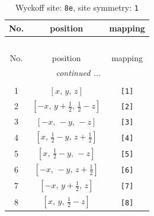 \documentclass[fleqn,8pt]{jsarticle}
\begin{document}
\renewcommand{\arraystretch}{1.2}
\begin{longtable}{ccc}
\caption{Wyckoff site: {\tt 8e}, site symmetry: {\tt 1}}
 \\
 \hline \hline
No. & position & mapping \\ \hline \endfirsthead

\multicolumn{2}{l}{\tablename\ \thetable{}} \\
 \hline \hline
No. & position & mapping \\ \hline \endhead

 \hline \hline
\multicolumn{2}{r}{\footnotesize\it continued ...} \\ \endfoot

 \hline \hline
\multicolumn{2}{r}{} \\ \endlastfoot

1 & $\left[ x,\, y,\, z \right]$ & {\tt [1]} \\ \hline
2 & $\left[ - x,\, y + \frac{1}{2},\, \frac{1}{2} - z \right]$ & {\tt [2]} \\ \hline
3 & $\left[ - x,\, - y,\, - z \right]$ & {\tt [3]} \\ \hline
4 & $\left[ x,\, \frac{1}{2} - y,\, z + \frac{1}{2} \right]$ & {\tt [4]} \\ \hline
5 & $\left[ x,\, \frac{1}{2} - y,\, - z \right]$ & {\tt [5]} \\ \hline
6 & $\left[ - x,\, - y,\, z + \frac{1}{2} \right]$ & {\tt [6]} \\ \hline
7 & $\left[ - x,\, y + \frac{1}{2},\, z \right]$ & {\tt [7]} \\ \hline
8 & $\left[ x,\, y,\, \frac{1}{2} - z \right]$ & {\tt [8]} \\
\end{longtable}
\end{document}
